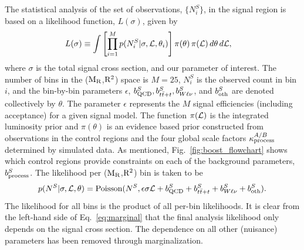 The statistical analysis of the set of observations,  $\{ N^S_i \}$, in the signal region is based
on a likelihood function, $L(\sigma)$, given by
\begin{align}
  L(\sigma) & \equiv  \int   \left[ \prod_{i=1}^M p(N^S_i | \sigma, {\cal L}, \theta_i)  \right] 
\pi(\theta) \, \pi({\cal L}) \, d\theta \, d{\cal L},
\label{eq:marginal}
\end{align}
where $\sigma$ is the total signal cross section, and our parameter of interest.
The number of bins in the ($\mathrm{M_R}$,$\mathrm{R^2}$) space is $M = 25$, $N^S_i$ is the observed count
in bin $i$, and the bin-by-bin parameters  $\epsilon$,  $b^S_{\rm QCD}, b^S_{t\bar{t}+t},
b^S_{W\ell\nu}$, and $b^S_{\rm oth}$ are denoted collectively by $\theta$. 
The parameter $\epsilon$ represents the $M$ signal efficiencies (including acceptance) for a given
signal model. 
%
The function $\pi({\cal L})$ is the integrated luminosity prior and $\pi(\theta)$ is an evidence
based prior constructed from observations in the control regions and the four global scale factors
$\kappa^{A/B}_{\rm process}$ determined by simulated data. 
%
As mentioned, Fig.~\ref{fig:boost_flowchart} shows which control regions provide constraints on
each of the background parameters, $b^S_{\rm process}$.
%
The likelihood per ($\mathrm{M_R}$,$\mathrm{R^2}$) bin is taken to be
\begin{equation}
 p(N^S | \sigma, {\cal L}, \theta) = \textrm{Poisson}(N^S,  \epsilon \sigma {\cal L} + b^S_{\rm QCD}
+ b^S_{t\bar{t}+t} + b^S_{W\ell\nu} +  b^{S}_{\rm oth}) .
\end{equation}
The likelihood for all bins is the product of all per-bin likelihoods. 
It is clear from the left-hand side of Eq.~\ref{eq:marginal} that the final analysis likelihood only
depends on the signal cross section. The dependence on all other (nuisance) parameters has been
removed through marginalization. 

